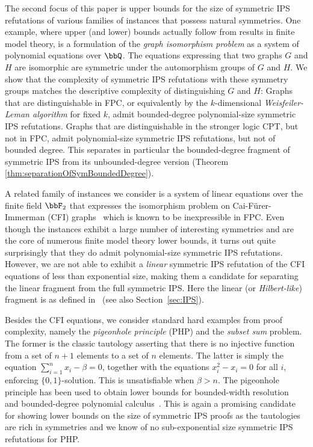 \documentclass[a4paper,UKenglish,cleveref, autoref, thm-restate]{lipics-v2021}
\begin{document}
	The second focus of this paper is upper bounds for the size of symmetric IPS refutations of various families of instances that possess natural symmetries. 
	One example, where upper (and lower) bounds actually follow from results in finite model theory, is a formulation of the \emph{graph isomorphism problem} as a system of polynomial equations \cite{GI} over $\bbQ$. The equations expressing that two graphs $G$ and $H$ are isomorphic are symmetric under the automorphism groups of $G$ and $H$. We show that the complexity of symmetric IPS refutations with these symmetry groups matches the descriptive complexity of distinguishing $G$ and $H$: Graphs that are distinguishable in FPC, or equivalently by the $k$-dimensional \emph{Weisfeiler-Leman algorithm} \cite{sandraSiglog} for fixed $k$, admit bounded-degree polynomial-size symmetric IPS refutations. Graphs that are distinguishable in the stronger logic CPT, but not in FPC, admit polynomial-size symmetric IPS refutations, but not of bounded degree. This separates in particular the bounded-degree fragment of symmetric IPS from its unbounded-degree version (Theorem \ref{thm:separationOfSymBoundedDegree}).
	
	A related family of instances we consider is a system of linear equations over the finite field $\bbF_2$ that expresses the isomorphism problem on Cai-Fürer-Immerman (CFI) graphs~\cite{caifurimm92, atseriasBulatovDawar} which is known to be inexpressible in FPC. Even though the instances exhibit a large number of interesting symmetries and are the core of numerous finite model theory lower bounds, it turns out quite surprisingly that they do admit polynomial-size symmetric IPS refutations. 
	However, we are not able to exhibit a \emph{linear} symmetric IPS refutation of the CFI equations of less than exponential size, making them a candidate for separating the linear fragment from the full symmetric IPS.  Here the linear (or \emph{Hilbert-like}) fragment is as defined in~\cite{IPS} (see also Section~\ref{sec:IPS}).
	
	Besides the CFI equations, we consider standard hard examples from proof complexity, namely the \emph{pigeonhole principle} (PHP) and the \emph{subset sum} problem. The former is the classic tautology asserting that there is no injective function from a set of $n+1$ elements to a set of $n$ elements. The latter is simply the equation $\sum_{i=1}^n x_i - \beta = 0$, together with the equations $x_i^2 - x_i = 0$ for all $i$, enforcing $\{0,1\}$-solution. This is unsatisfiable when $\beta > n$.  The pigeonhole principle has been used to obtain lower bounds for bounded-width resolution~\cite{haken} and bounded-degree polynomial calculus~\cite{razborov1998lower}.  This is again a promising candidate for showing lower bounds on the size of symmetric IPS proofs as the tautologies are rich in symmetries and we know of no sub-exponential size symmetric IPS refutations for PHP.
	
\end{document}
